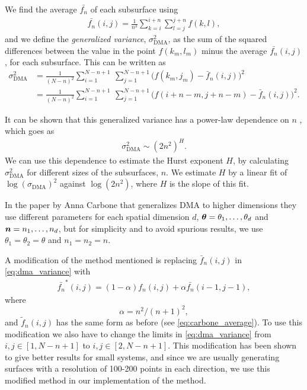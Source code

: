 We find the average $\bar {f_n}$ of each subsurface using
\begin{align}
    \bar {f_n}(i,j) = \frac{1}{n^2} \sum_{k = i}^{i+n} \sum_{l = j}^{j+n} f(k,l),
    \label{eq:carbone_average}
\end{align}
and we define the \emph{generalized variance}, $\sigma_\text{DMA}^2$, as the sum of the squared differences between the value in the point $f(k_m,l_m)$ minus the average $\bar {f_n}(i,j)$, for each subsurface. This can be written as
\begin{align}
    \sigma_\text{DMA}^2 
    &= \frac{1}{(N-n)^2}\sum_{i=1}^{N-n+1} ~ \sum_{j=1}^{N-n+1} 
    \big(
        f(k_m,j_m) - \bar f_n(i,j)
    \big)^2%
    \nonumber\\%
    &= \frac{1}{(N-n)^2}\sum_{i=1}^{N-n+1} ~ \sum_{j=1}^{N-n+1} 
    \big(
        f(i+n-m,j+n-m) - \bar f_n(i,j)
    \big)^2.
    \label{eq:dma_variance}
\end{align}

It can be shown that this generalized variance has a power-law dependence on $n$ \cite{alessio2002dma,carbone2007algorithm}, which goes as
\begin{align*}
    \sigma_\text{DMA}^2 \sim \left(2n^2\right)^H.
\end{align*}
We can use this dependence to estimate the Hurst exponent $H$, by calculating $\sigma_\text{DMA}^2$ for different sizes of the subsurfaces, $n$. We estimate $H$ by a linear fit of $\log \left(\sigma_\text{DMA}\right)^2$ against $\log \left(2n^2 \right)$, where $H$ is the slope of this fit.

In the paper by Anna Carbone that generalizes DMA to higher dimensions\cite{carbone2007algorithm} they use different parameters for each spatial dimension $d$, $\boldsymbol{\theta} = \theta_1, \dots, \theta_d$ and $\boldsymbol{n} = n_1, \dots, n_d$, but for simplicity and to avoid spurious results, we use $\theta_1 = \theta_2 = \theta$ and $n_1 = n_2 = n$.

A modification of the method mentioned is replacing $\bar f_n(i,j)$ in \cref{eq:dma_variance} with
\begin{align*}
    \bar {f_n}^*(i,j) = (1-\alpha) f_n(i,j) + \alpha \bar {f_n}(i-1,j-1),
\end{align*}
where
\[
    \alpha = n^2/(n+1)^2,
\]
and $\tilde f_n(i,j)$ has the same form as before (see \cref{eq:carbone_average}). To use this modification we also have to change the limits in \cref{eq:dma_variance} from ${i,j\in [1,N-n+1]}$ to $i,j\in [2,N-n+1]$. This modification has been shown to give better results for small systems\cite{carbone2007algorithm}, and since we are usually generating surfaces with a resolution of 100-200 points in each direction, we use this modified method in our implementation of the method.

